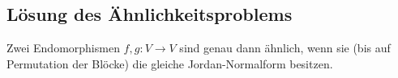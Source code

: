 


\subsection{Lösung des Ähnlichkeitsproblems}

\begin{theorem}
  Zwei Endomorphismen $f, g \colon V \to V$ sind genau dann ähnlich, wenn sie (bis auf Permutation der Blöcke) die gleiche Jordan-Normalform besitzen.
\end{theorem}













